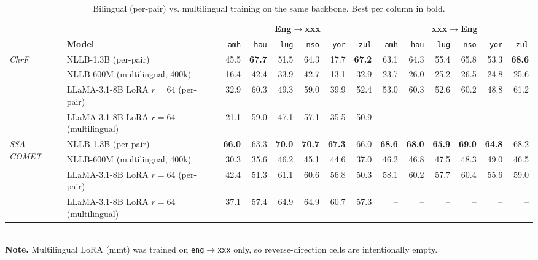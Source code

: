 \begin{table}[t!]
\centering
\footnotesize
\setlength{\tabcolsep}{4pt}
\renewcommand{\arraystretch}{1.05}
\caption{Bilingual (per-pair) vs. multilingual training on the same backbone. Best per column in bold.}
\label{tab:bil_vs_multi}
\begin{tabular}{llrrrrrrrrrrrr}
\toprule
 & & \multicolumn{6}{c}{\textbf{Eng$\to$xxx}} & \multicolumn{6}{c}{\textbf{xxx$\to$Eng}} \\
\cmidrule(lr){3-8}\cmidrule(lr){9-14}
 & \textbf{Model} & \texttt{amh} & \texttt{hau} & \texttt{lug} & \texttt{nso} & \texttt{yor} & \texttt{zul} & \texttt{amh} & \texttt{hau} & \texttt{lug} & \texttt{nso} & \texttt{yor} & \texttt{zul} \\
\midrule
\multirow{4}{*}{\textit{ChrF}} & NLLB-1.3B (per-pair) & 45.5 & \textbf{67.7} & 51.5 & 64.3 & 17.7 & \textbf{67.2} & 63.1 & 64.3 & 55.4 & 65.8 & 53.3 & \textbf{68.6} \\
 & NLLB-600M (multilingual, 400k) & 16.4 & 42.4 & 33.9 & 42.7 & 13.1 & 32.9 & 23.7 & 26.0 & 25.2 & 26.5 & 24.8 & 25.6 \\
 & LLaMA-3.1-8B LoRA $r{=}64$ (per-pair) & 32.9 & 60.3 & 49.3 & 59.0 & 39.9 & 52.4 & 53.0 & 60.3 & 52.6 & 60.2 & 48.8 & 61.2 \\
 & LLaMA-3.1-8B LoRA $r{=}64$ (multilingual) & 21.1 & 59.0 & 47.1 & 57.1 & 35.5 & 50.9 & -- & -- & -- & -- & -- & -- \\
\midrule
\multirow{4}{*}{\textit{SSA-COMET}} & NLLB-1.3B (per-pair) & \textbf{66.0} & 63.3 & \textbf{70.0} & \textbf{70.7} & \textbf{67.3} & 66.0 & \textbf{68.6} & \textbf{68.0} & \textbf{65.9} & \textbf{69.0} & \textbf{64.8} & 68.2 \\
 & NLLB-600M (multilingual, 400k) & 30.3 & 35.6 & 46.2 & 45.1 & 44.6 & 37.0 & 46.2 & 46.8 & 47.5 & 48.3 & 49.0 & 46.5 \\
 & LLaMA-3.1-8B LoRA $r{=}64$ (per-pair) & 42.4 & 51.3 & 61.1 & 60.6 & 56.8 & 50.3 & 58.1 & 60.2 & 57.7 & 60.4 & 55.6 & 59.0 \\
 & LLaMA-3.1-8B LoRA $r{=}64$ (multilingual) & 37.1 & 57.4 & 64.9 & 64.9 & 60.7 & 57.3 & -- & -- & -- & -- & -- & -- \\
\bottomrule
\end{tabular}
\\[2pt]\footnotesize{\textbf{Note.} Multilingual LoRA (mmt) was trained on \texttt{eng}$\to$\texttt{xxx} only, so reverse-direction cells are intentionally empty.}
\end{table}